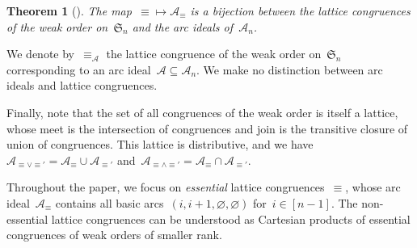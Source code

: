 \documentclass{amsart}
\newtheorem{theorem}{Theorem}[section]
\theoremstyle{definition}
\newcommand{\f}[1]{{\mathfrak{#1}}} %
\newcommand{\darkblue}{\color{darkblue}} %
\newcommand{\defn}[1]{\textsl{\darkblue #1}} %
\newcommand{\arcs}{{\mathcal{A}}} %
\newcommand{\meet}{\wedge} %
\newcommand{\join}{\vee} %
\begin{document}
\begin{theorem}[{\cite[Thm.~4.4 \& Coro.~4.5]{Reading-arcDiagrams}}]
The map~${\equiv} \mapsto \arcs_\equiv$ is a bijection between the lattice congruences of the weak order on~$\f{S}_n$ and the arc ideals of~$\arcs_n$.
\end{theorem}

We denote by~$\equiv_\arcs$ the lattice congruence of the weak order on~$\f{S}_n$ corresponding to an arc ideal~$\arcs \subseteq \arcs_n$.
We make no distinction between arc ideals and lattice congruences.

Finally, note that the set of all congruences of the weak order is itself a lattice, whose meet is the intersection of congruences and join is the transitive closure of union of congruences.
This lattice is distributive, and we have~$\arcs_{{\equiv} \join {\equiv'}} = \arcs_\equiv \cup \arcs_{\equiv'}$ and~$\arcs_{{\equiv} \meet {\equiv'}} = \arcs_\equiv \cap \arcs_{\equiv'}$.

Throughout the paper, we focus on \defn{essential} lattice congruences~$\equiv$, whose arc ideal~$\arcs_\equiv$ contains all basic arcs~$(i, i+1, \varnothing, \varnothing)$ for~$i \in [n-1]$.
The non-essential lattice congruences can be understood as Cartesian products of essential congruences of weak orders of smaller rank.
\end{document}
